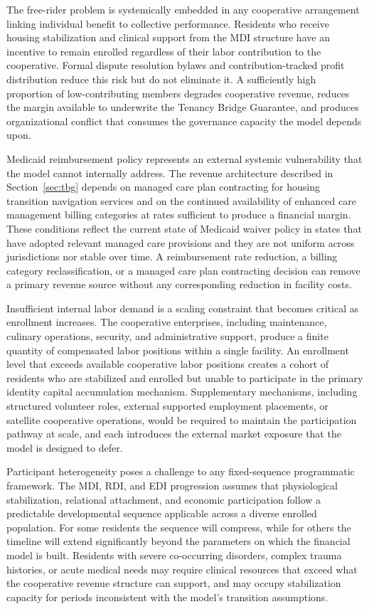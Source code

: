\documentclass[12pt, letterpaper]{article}
\begin{document}
The free-rider problem is systemically embedded in any cooperative arrangement linking individual benefit to collective performance. Residents who receive housing stabilization and clinical support from the MDI structure have an incentive to remain enrolled regardless of their labor contribution to the cooperative. Formal dispute resolution bylaws and contribution-tracked profit distribution reduce this risk but do not eliminate it. A sufficiently high proportion of low-contributing members degrades cooperative revenue, reduces the margin available to underwrite the Tenancy Bridge Guarantee, and produces organizational conflict that consumes the governance capacity the model depends upon.

Medicaid reimbursement policy represents an external systemic vulnerability that the model cannot internally address. The revenue architecture described in Section~\ref{sec:tbg} depends on managed care plan contracting for housing transition navigation services and on the continued availability of enhanced care management billing categories at rates sufficient to produce a financial margin. These conditions reflect the current state of Medicaid waiver policy in states that have adopted relevant managed care provisions and they are not uniform across jurisdictions nor stable over time. A reimbursement rate reduction, a billing category reclassification, or a managed care plan contracting decision can remove a primary revenue source without any corresponding reduction in facility costs.

Insufficient internal labor demand is a scaling constraint that becomes critical as enrollment increases. The cooperative enterprises, including maintenance, culinary operations, security, and administrative support, produce a finite quantity of compensated labor positions within a single facility. An enrollment level that exceeds available cooperative labor positions creates a cohort of residents who are stabilized and enrolled but unable to participate in the primary identity capital accumulation mechanism. Supplementary mechanisms, including structured volunteer roles, external supported employment placements, or satellite cooperative operations, would be required to maintain the participation pathway at scale, and each introduces the external market exposure that the model is designed to defer.

Participant heterogeneity poses a challenge to any fixed-sequence programmatic framework. The MDI, RDI, and EDI progression assumes that physiological stabilization, relational attachment, and economic participation follow a predictable developmental sequence applicable across a diverse enrolled population. For some residents the sequence will compress, while for others the timeline will extend significantly beyond the parameters on which the financial model is built. Residents with severe co-occurring disorders, complex trauma histories, or acute medical needs may require clinical resources that exceed what the cooperative revenue structure can support, and may occupy stabilization capacity for periods inconsistent with the model's transition assumptions.
\end{document}
